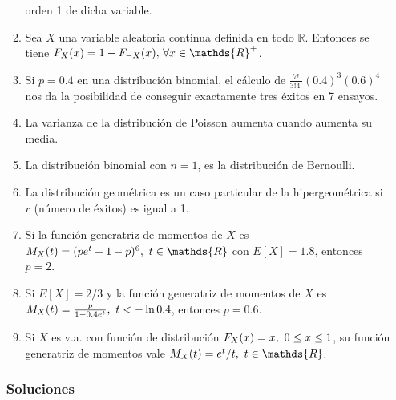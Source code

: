 \documentclass[fleqn]{article}
\def\R{\mathds{R}}
\def\ss{\thinspace \thinspace}
\begin{document}
\begin{enumerate}
\begin{enumerate}
                                        orden 1 de dicha variable.
                                \item Sea $X$ una variable aleatoria continua definida en todo $\R$. Entonces se tiene 
                                        $F_X (x) = 1 - F_{-X} (x), \thinspace \forall x \in \R^+$.
                                \item Si $p=0.4$ en una distribución binomial, el cálculo de $\frac{7!}{3! 4!} (0.4)^3 (0.6)^4$ nos da la posibilidad 
                                        de conseguir exactamente tres éxitos en 7 ensayos.
                                \item La varianza de la distribución de Poisson aumenta cuando aumenta su media.
                                \item La distribución binomial con $n=1$, es la distribución de Bernoulli.
                                \item La distribución geométrica es un caso particular de la hipergeométrica si $r$ (número de éxitos) es igual a 1.
                                \item Si la función generatriz de momentos de $X$ es $M_X(t) = (pe^t + 1 -p)^6, \ss t \in \R$ con $E[X] = 1.8$, 
                                        entonces $p=2$.
                                \item Si $E[X] = 2/3$ y la función generatriz de momentos de $X$ es $M_X(t) = \frac{p}{1-0.4e^t}, \ss t< -\ln 0.4$,
                                        entonces $p=0.6$.
                                \item Si $X$ es v.a. con función de distribución $F_X(x) = x, \ss 0 \leq x \leq 1$, su función generatriz de momentos
                                        vale $M_X(t) = e^t /t, \ss t \in \R$.
                        \end{enumerate}
                

                \newpage 

                \subsubsection{Soluciones}


\end{enumerate}
\end{document}
